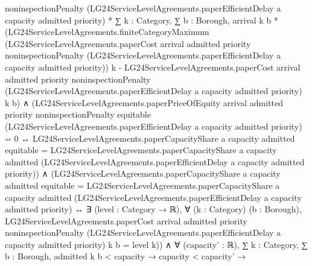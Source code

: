 \documentclass[10pt]{article}
\begin{document}
\begin{ReviewVerbatim}
                                  noninspectionPenalty
                                  (LG24ServiceLevelAgreements.paperEfficientDelay a capacity admitted priority) *
                              ∑ k : Category,
                                ∑ b : Borough,
                                  arrival k b *
                                    (LG24ServiceLevelAgreements.finiteCategoryMaximum
                                        (LG24ServiceLevelAgreements.paperCost arrival admitted priority
                                          noninspectionPenalty
                                          (LG24ServiceLevelAgreements.paperEfficientDelay a capacity admitted priority))
                                        k -
                                      LG24ServiceLevelAgreements.paperCost arrival admitted priority
                                        noninspectionPenalty
                                        (LG24ServiceLevelAgreements.paperEfficientDelay a capacity admitted priority) k
                                        b) ∧
                          (LG24ServiceLevelAgreements.paperPriceOfEquity arrival admitted priority noninspectionPenalty
                                  equitable
                                  (LG24ServiceLevelAgreements.paperEfficientDelay a capacity admitted priority) =
                                0 ↔
                              LG24ServiceLevelAgreements.paperCapacityShare a capacity admitted equitable =
                                LG24ServiceLevelAgreements.paperCapacityShare a capacity admitted
                                  (LG24ServiceLevelAgreements.paperEfficientDelay a capacity admitted priority)) ∧
                            (LG24ServiceLevelAgreements.paperCapacityShare a capacity admitted equitable =
                                LG24ServiceLevelAgreements.paperCapacityShare a capacity admitted
                                  (LG24ServiceLevelAgreements.paperEfficientDelay a capacity admitted priority) ↔
                              ∃ (level : Category → ℝ),
                                ∀ (k : Category) (b : Borough),
                                  LG24ServiceLevelAgreements.paperCost arrival admitted priority noninspectionPenalty
                                      (LG24ServiceLevelAgreements.paperEfficientDelay a capacity admitted priority) k
                                      b =
                                    level k)) ∧
                  ∀ (capacity' : ℝ),
                    ∑ k : Category, ∑ b : Borough, admitted k b < capacity →
                      capacity < capacity' →

\end{ReviewVerbatim}
\end{document}
